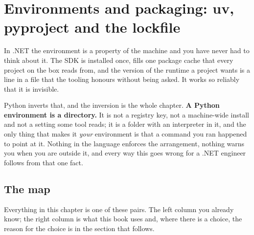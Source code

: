 
\chapter{Environments and packaging: uv, pyproject and the lockfile}
\label{ch:packaging}

\noindent
In .NET the environment is a property of the machine and you have never had
to think about it. The SDK is installed once,  fills one
package cache that every project on the box reads from, and the version of
the runtime a project wants is a line in a file that the tooling honours
without being asked. It works so reliably that it is invisible.

Python inverts that, and the inversion is the whole chapter.
\textbf{A Python environment is a directory.} It is not a registry key, not a
machine-wide install and not a setting some tool reads; it is a folder with an
interpreter in it, and the only thing that makes it \emph{your} environment is
that a command you ran happened to point at it. Nothing in the language
enforces the arrangement, nothing warns you when you are outside it, and every
way this goes wrong for a .NET engineer follows from that one fact.

\section{The map}
\label{sec:ch02-map}

\noindent
Everything in this chapter is one of these pairs. The left column you already
know; the right column is what this book uses and, where there is a choice, the
reason for the choice is in the section that follows.

